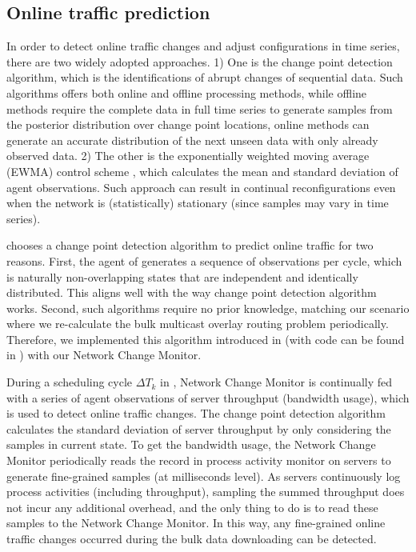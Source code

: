 {\subsection{Online traffic prediction}
\label{subsec:dynamic:prediction}
In order to detect online traffic changes and adjust configurations in time series, there are two widely adopted approaches. 1) One is the change point detection algorithm, which is the identifications of abrupt changes of sequential data. Such algorithms offers both online and offline processing methods, while offline methods \cite{smith1975bayesian,stephens1994bayesian,barry1993bayesian,green1995reversible} require the complete data in full time series to generate samples from the posterior distribution over change point locations, online methods \cite{page1955test,desobry2005online,lorden1971procedures} can generate an accurate distribution of the next unseen data with only already observed data. 2) The other is the exponentially weighted moving average (EWMA) control scheme \cite{roberts1959control,lucas1990exponentially}, which calculates the mean and standard deviation of agent observations. Such approach can result in continual reconfigurations even when the network is (statistically) stationary (since samples may vary in time series).

\newname chooses a change point detection algorithm \cite{adams2007bayesian} to predict online traffic for two reasons. First, the agent of \name generates a sequence of observations per cycle, which is naturally non-overlapping states that are independent and identically distributed. This aligns well with the way change point detection algorithm works. Second, such algorithms require no prior knowledge, matching our scenario where we re-calculate the bulk multicast overlay routing problem periodically. Therefore, we implemented this algorithm introduced in \cite{adams2007bayesian} (with code can be found in \cite{BOCDcode}) with our Network Change Monitor.

During a scheduling cycle $\Delta T_k$ in \name, Network Change Monitor is continually fed with a series of agent observations of server throughput (bandwidth usage), which is used to detect online traffic changes. The change point detection algorithm calculates the standard deviation of server throughput by only considering the samples in current state. To get the bandwidth usage, the Network Change Monitor periodically reads the record in process activity monitor on servers to generate fine-grained samples (at milliseconds level). As servers continuously log process activities (including throughput), sampling the summed throughput does not incur any additional overhead, and the only thing to do is to read these samples to the Network Change Monitor. In this way, any fine-grained online traffic changes occurred during the bulk data downloading can be detected.


}
